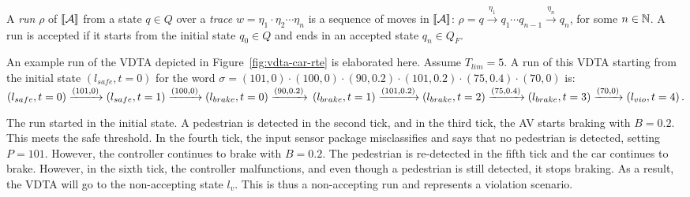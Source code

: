 A {\em run} $\rho$ of $[\!\left[{\mathcal A}\right]\!]$ from a state $q\in Q$ over a {\em trace} $w =  \eta_1\cdot \eta_2\cdots \eta_n$ is a sequence of moves in $[\!\left[{\mathcal A}\right]\!]$:
$\rho = q \xrightarrow {\eta_1} q_1
\cdots q_{n-1}\xrightarrow {\eta_n} q_{n}$,
for some $n\in\mathbb{N}$.
A run is accepted if it starts from the initial state $q_0\in Q$ and ends in an accepted state $q_n \in Q_F$.

\begin{example}[Run of a VDTA]
	An example run of the VDTA depicted in Figure~\ref{fig:vdta-car-rte} is elaborated here.
	Assume $T_{lim} = 5$.
	A run of this VDTA starting from the initial state $\left(l_{safe}, t = 0\right)$ for the word $\sigma = \left(101,0\right)\cdot \left(100,0\right)\cdot \left(90,0.2\right)\cdot \left(101,0.2\right)\cdot\left(75,0.4\right)\cdot \left(70,0\right)$ is:\\
	{\small$
		\left(l_{safe}, t = 0\right)
		\xrightarrow {\left(101, 0\right)} 
		\left(l_{safe}, t = 1\right)
		\xrightarrow {\left(100, 0\right)} 
		\left(l_{brake}, t = 0\right)
		\xrightarrow {\left(90, 0.2\right)} \\
		\left(l_{brake}, t = 1\right)
		\xrightarrow {\left(101, 0.2\right)} 
		\left(l_{brake}, t = 2\right)
		\xrightarrow {\left(75, 0.4\right)} 
		\left(l_{brake}, t = 3\right)
		\xrightarrow {\left(70, 0\right)} 
		\left(l_{vio}, t = 4\right).
		$
	}
	
	The run started in the initial state.
	A pedestrian is detected in the second tick, and in the third tick, the \ac{AV} starts braking with $B = 0.2$. 
	This meets the safe threshold.
	In the fourth tick, the input sensor package misclassifies and says that no pedestrian is detected, setting $P = 101$.
	However, the controller continues to brake with $B = 0.2$.
	The pedestrian is re-detected in the fifth tick and the car continues to brake.
	However, in the sixth tick, the controller malfunctions, and even though a pedestrian is still detected, it stops braking.
	As a result, the \ac{VDTA} will go to the non-accepting state $l_v$. 
	This is thus a non-accepting run and represents a violation scenario.
\end{example}
